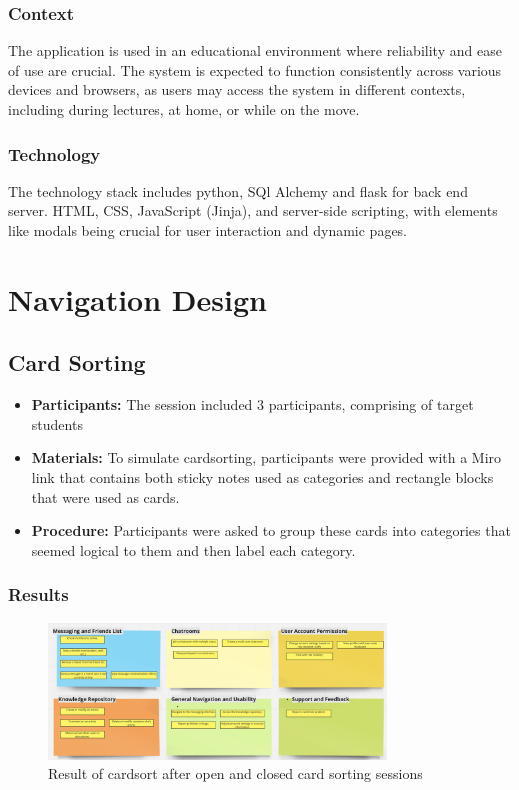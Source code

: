 \documentclass[12pt,a4paper]{article}
\begin{document}
\subsubsection*{Context}
The application is used in an educational environment where reliability and ease of use are crucial. The system is expected to function consistently across various devices and browsers, as users may access the system in different contexts, including during lectures, at home, or while on the move.

\subsubsection*{Technology}
The technology stack includes python, SQl Alchemy and flask for back end server. HTML, CSS, JavaScript (Jinja), and server-side scripting, with elements like modals being crucial for user interaction and dynamic pages. 

\section{Navigation Design }
\subsection*{Card Sorting}

\begin{itemize}
    \item \textbf{Participants:} The session included 3 participants, comprising of target students
    \item \textbf{Materials:} To simulate cardsorting, participants were provided with a Miro link that contains both sticky notes used as categories and rectangle blocks that were used as cards. 
    \item \textbf{Procedure:} Participants were asked to group these cards into categories that seemed logical to them and then label each category.
\end{itemize}

\subsubsection*{Results}
\begin{figure}[H]
\centering
\includegraphics[width=0.8\textwidth]{cardsort.png} 
\caption{Result of cardsort after open and closed card sorting sessions}
\label{fig:sitemap}
\end{figure}
\end{document}
